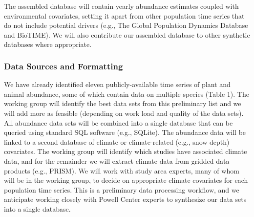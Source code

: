 \documentclass[12pt,]{article}
\begin{document}
The assembled database will contain yearly abundance estimates coupled
with environmental covariates, setting it apart from other population
time series that do not include potential drivers (e.g., The Global
Population Dynamics Database and BioTIME). We will also contribute our
assembled database to other synthetic databases where appropriate.

\subsubsection{Data Sources and Formatting}

We have already identified eleven publicly-available time series of
plant and animal abundance, some of which contain data on multiple
species (Table 1). The working group will identify the best data sets
from this preliminary list and we will add more as feasible (depending
on work load and quality of the data sets). All abundance data sets will
be combined into a single database that can be queried using standard
SQL software (e.g., SQLite). The abundance data will be linked to a
second database of climate or climate-related (e.g., snow depth)
covariates. The working group will identify which studies have
associated climate data, and for the remainder we will extract climate
data from gridded data products (e.g., PRISM). We will work with study
area experts, many of whom will be in the working group, to decide on
appropriate climate covariates for each population time series. This is
a preliminary data processing workflow, and we anticipate working
closely with Powell Center experts to synthesize our data sets into a
single database.

\footnotesize
\end{document}
